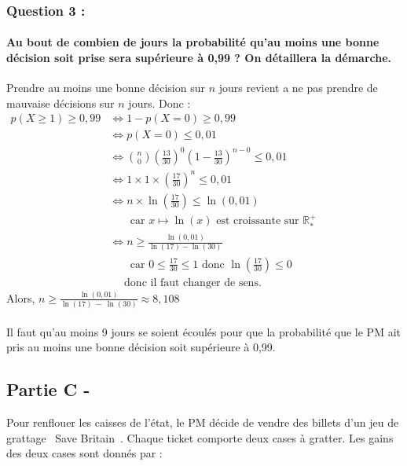 \documentclass[a4paper, 12pt]{article}
\begin{document}
{}
\subsubsection*{Question 3 :}
\paragraph*{Au bout de combien de jours la probabilité qu'au moins une bonne décision soit prise sera supérieure à 0,99 ? On détaillera la démarche.\\[5mm]}

Prendre au moins une bonne décision sur $n$ jours revient a ne pas prendre de mauvaise décisions sur $n$ jours. Donc : \\
$\begin{aligned}
p(X \geq 1) \geq 0,99 &\iff 1 - p(X = 0) \geq 0,99 \\
&\iff p(X = 0) \leq 0,01 \\
&\iff \binom{n}{0} \left( \frac{13}{30}\right)^0 \left(1 - \frac{13}{30}\right)^{n-0} \leq 0,01 \\
&\iff 1 \times 1 \times \left(\frac{17}{30} \right)^n \leq 0,01 \\
&\iff n \times \ln{\left( \frac{17}{30} \right) } \leq \ln{\left(0,01\right)} \\ 
&\phantom{\iff} \text{ car } x \mapsto \ln{\left(x\right)} \text{ est croissante sur } \mathbb{R}^+_*\\
&\iff n  \geq \frac{\ln{\left(0,01\right)}}{\ln{\left(17\right)}-\ln{\left(30\right)}} \\
&\phantom{\iff} \text{ car } 0 \leq \frac{17}{30} \leq 1 \text{ donc } \ln{\left(\frac{17}{30}\right)} \leq 0 \\
& \phantom{\iff} \text{ donc il faut changer de sens.}
\end{aligned}$
\\[2mm]
Alors, $n \geq \frac{\ln{\left(0,01\right)}}{\ln{\left(17\right)}\ -\ \ln{\left(30\right)}} \approx 8,108 $
\\ \\
Il faut qu'au moins 9 jours se soient écoulés pour que la probabilité que le PM ait pris au moins une bonne décision soit supérieure à 0,99.

{}
\subsection*{Partie C -}
Pour renflouer les caisses de l'état, le PM décide de vendre des billets d'un jeu de grattage \guillemotleft\ Save Britain\ \guillemotright. Chaque ticket comporte deux cases à gratter. 
Les gains des deux cases sont donnés par : 
\\
\end{document}
